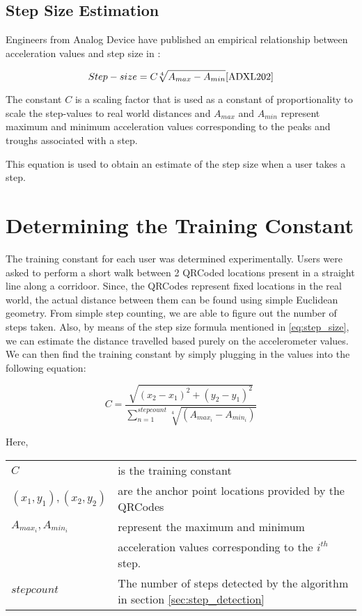 \subsection{Step Size Estimation}

Engineers from Analog Device have published an empirical relationship between 
acceleration values and step size in \cite{ADXL202}:

\begin{equation}\label{eq:step_size}
 Step-size = C \sqrt[4]{A_{max} - A_{min}} \cite{ADXL202}
\end{equation}

The constant $C$ is a scaling factor that is used as a constant of proportionality
to scale the step-values to real world distances and $A_{max}$ and $A_{min}$
represent maximum and minimum acceleration values corresponding to the 
peaks and troughs associated with a step. 

This equation is used to obtain an estimate of the step size when a user 
takes a step.

\section{Determining the Training Constant}

The training constant for each user was determined experimentally. 
Users were asked to perform a short walk between 2 QRCoded locations
present in a straight line along a corridoor.
Since, the QRCodes represent fixed locations in the real world, the actual 
distance between them can be found using simple Euclidean geometry. From 
simple step counting, we are able to figure out the number of steps taken.
Also, by means of the step size formula mentioned in \eqref{eq:step_size},
we can estimate the distance travelled based purely on the accelerometer
values. We can then find the training constant by simply plugging in 
the values into the following equation:

\begin{equation}
C=\frac{\sqrt{(x_{2}-x_{1})^{2}+(y_{2}-y_{1})^{2}}}{\sum_{n=1}^{stepcount}\sqrt[4]{(A_{max_{i}}-A_{min_{i}})}}
\end{equation}

Here,\\
\begin{tabular}{l l}
$C$                         & is the training constant   \\
$(x_1, y_1), (x_2, y_2)$    & are the anchor point locations provided by the QRCodes \\
$A_{max_{i}}, A_{min_{i}}$  & represent the maximum and minimum \\
                            & acceleration values corresponding to the $i^{th}$ step.\\
$stepcount$                 & The number of steps detected by the algorithm in section \ref{sec:step_detection} \\
\end{tabular}


